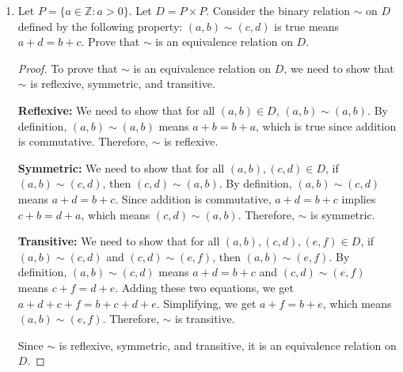 \documentclass{article}
\newcommand\Z{\mathbb{Z}}
\begin{document}
\begin{enumerate}

    \item Let $P = \{a \in \Z : a > 0\}$. Let $D = P \times P$. Consider the binary
          relation $\sim$ on $D$ defined by the following property: $(a,b) \sim (c,d)$ is
          true means $a+d=b+c$. Prove that $\sim$ is an equivalence relation on $D$.

          \begin{proof}
              To prove that $\sim$ is an equivalence relation on $D$, we need to show that $\sim$ is reflexive, symmetric, and transitive.

              \textbf{Reflexive:} We need to show that for all $(a,b) \in D$, $(a,b) \sim (a,b)$. By definition, $(a,b) \sim (a,b)$ means $a+b = b+a$, which is true since addition is commutative. Therefore, $\sim$ is reflexive.

              \textbf{Symmetric:} We need to show that for all $(a,b), (c,d) \in D$, if $(a,b) \sim (c,d)$, then $(c,d) \sim (a,b)$. By definition, $(a,b) \sim (c,d)$ means $a+d = b+c$. Since addition is commutative, $a+d = b+c$ implies $c+b = d+a$, which means $(c,d) \sim (a,b)$. Therefore, $\sim$ is symmetric.

              \textbf{Transitive:} We need to show that for all $(a,b), (c,d), (e,f) \in D$, if $(a,b) \sim (c,d)$ and $(c,d) \sim (e,f)$, then $(a,b) \sim (e,f)$. By definition, $(a,b) \sim (c,d)$ means $a+d = b+c$ and $(c,d) \sim (e,f)$ means $c+f = d+e$. Adding these two equations, we get $a+d + c+f = b+c + d+e$. Simplifying, we get $a+f = b+e$, which means $(a,b) \sim (e,f)$. Therefore, $\sim$ is transitive.

              Since $\sim$ is reflexive, symmetric, and transitive, it is an equivalence
              relation on $D$.
          \end{proof}

          \newpage


\end{enumerate}
\end{document}
